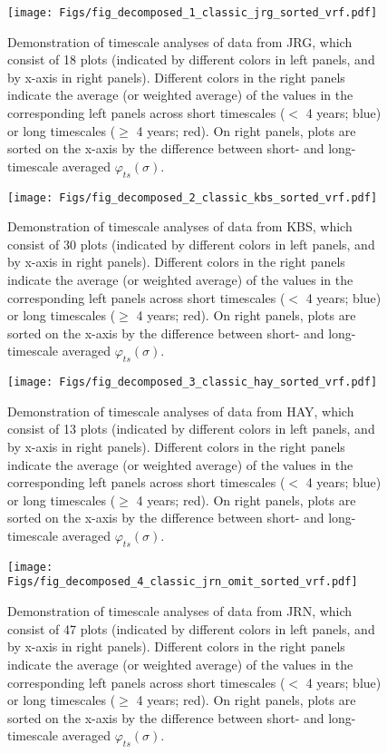 \documentclass[letterpaper,11pt]{article}
\begin{document}



\newpage
\clearpage



\begin{figure}
\texttt{[image: Figs/fig\_decomposed\_1\_classic\_jrg\_sorted\_vrf.pdf]}
\caption{Demonstration of timescale analyses of data from JRG, which consist of 18 plots (indicated by different colors in left panels, and by x-axis in right panels). Different colors in the right panels indicate the average (or weighted average) of the values in the corresponding left panels across short timescales ($<$ 4 years; blue) or long timescales ($\geq$ 4 years; red). On right panels, plots are sorted on the x-axis by the difference between short- and long-timescale averaged $\varphi _{ts} (\sigma)$.}
\end{figure}

\begin{figure}
\texttt{[image: Figs/fig\_decomposed\_2\_classic\_kbs\_sorted\_vrf.pdf]}
\caption{Demonstration of timescale analyses of data from KBS, which consist of 30 plots (indicated by different colors in left panels, and by x-axis in right panels). Different colors in the right panels indicate the average (or weighted average) of the values in the corresponding left panels across short timescales ($<$ 4 years; blue) or long timescales ($\geq$ 4 years; red). On right panels, plots are sorted on the x-axis by the difference between short- and long-timescale averaged $\varphi _{ts} (\sigma)$.}
\end{figure}

\begin{figure}
\texttt{[image: Figs/fig\_decomposed\_3\_classic\_hay\_sorted\_vrf.pdf]}
\caption{Demonstration of timescale analyses of data from HAY, which consist of 13 plots (indicated by different colors in left panels, and by x-axis in right panels). Different colors in the right panels indicate the average (or weighted average) of the values in the corresponding left panels across short timescales ($<$ 4 years; blue) or long timescales ($\geq$ 4 years; red). On right panels, plots are sorted on the x-axis by the difference between short- and long-timescale averaged $\varphi _{ts} (\sigma)$.}
\end{figure}

\begin{figure}
\texttt{[image: Figs/fig\_decomposed\_4\_classic\_jrn\_omit\_sorted\_vrf.pdf]}
\caption{Demonstration of timescale analyses of data from JRN, which consist of 47 plots (indicated by different colors in left panels, and by x-axis in right panels). Different colors in the right panels indicate the average (or weighted average) of the values in the corresponding left panels across short timescales ($<$ 4 years; blue) or long timescales ($\geq$ 4 years; red). On right panels, plots are sorted on the x-axis by the difference between short- and long-timescale averaged $\varphi _{ts} (\sigma)$.}
\end{figure}
\end{document}

